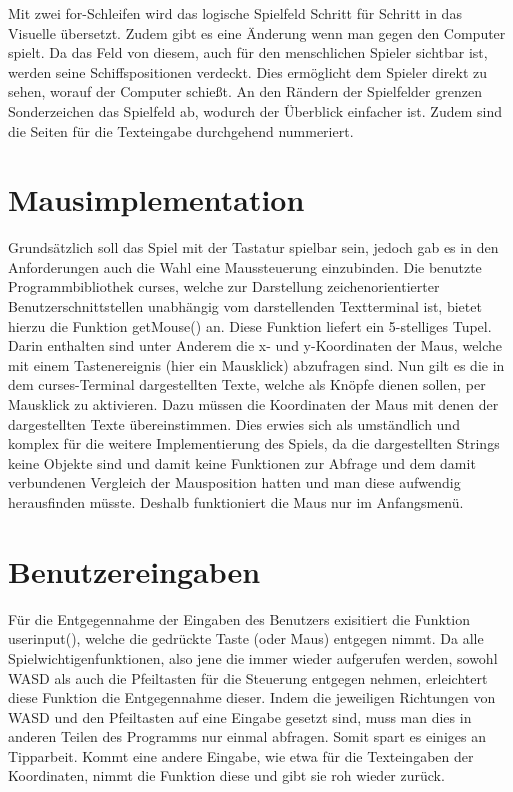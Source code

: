 \documentclass{llncs}
\begin{document}
Mit zwei for-Schleifen wird das logische Spielfeld Schritt für Schritt in das Visuelle übersetzt. Zudem gibt es eine Änderung wenn man gegen den Computer spielt. Da das Feld von diesem,
auch für den menschlichen Spieler sichtbar ist, werden seine Schiffspositionen verdeckt. Dies ermöglicht dem Spieler direkt zu sehen, worauf der Computer schießt. 
An den Rändern der Spielfelder grenzen Sonderzeichen das Spielfeld ab, wodurch der Überblick einfacher ist. Zudem sind die Seiten für die Texteingabe durchgehend nummeriert.

\section{Mausimplementation}

Grundsätzlich soll das Spiel mit der Tastatur spielbar sein, jedoch gab es in den Anforderungen auch die Wahl eine Maussteuerung einzubinden.
Die benutzte Programmbibliothek \glqq curses\grqq{}, welche zur Darstellung zeichenorientierter Benutzerschnittstellen unabhängig vom darstellenden Textterminal ist,
bietet hierzu die Funktion \glqq getMouse()\grqq{} an. Diese Funktion liefert ein 5-stelliges Tupel. Darin enthalten sind unter Anderem die x- und y-Koordinaten der Maus,
welche mit einem Tastenereignis (hier ein Mausklick) abzufragen sind. Nun gilt es die in dem curses-Terminal dargestellten Texte, welche als Knöpfe dienen sollen,
per Mausklick zu aktivieren. Dazu müssen die Koordinaten der Maus mit denen der dargestellten Texte übereinstimmen. Dies erwies sich als umständlich und komplex für die
weitere Implementierung des Spiels, da die dargestellten Strings keine Objekte sind und damit keine Funktionen zur Abfrage und dem damit verbundenen Vergleich der Mausposition hatten und man diese aufwendig herausfinden müsste.
Deshalb funktioniert die Maus nur im Anfangsmenü.

\section{Benutzereingaben}

Für die Entgegennahme der Eingaben des Benutzers exisitiert die Funktion \glqq userinput()\grqq{}, welche die gedrückte Taste (oder Maus) entgegen nimmt.
Da alle Spielwichtigenfunktionen, also jene die immer wieder aufgerufen werden, sowohl WASD als auch die Pfeiltasten für die Steuerung entgegen nehmen, erleichtert diese
Funktion die Entgegennahme dieser. Indem die jeweiligen Richtungen von WASD und den Pfeiltasten auf eine Eingabe gesetzt sind, muss man dies in anderen Teilen des Programms
nur einmal abfragen. Somit spart es einiges an Tipparbeit. Kommt eine andere Eingabe, wie etwa für die Texteingaben der Koordinaten, nimmt die Funktion diese und gibt sie
roh wieder zurück.
\end{document}

